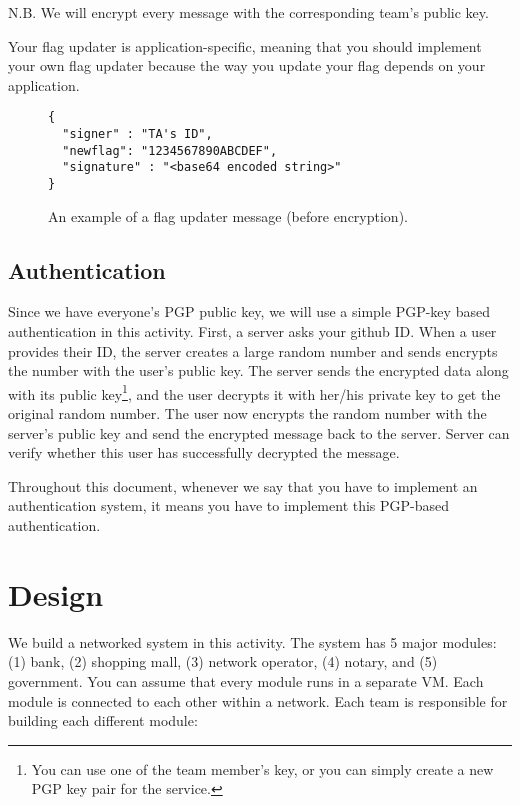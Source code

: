 \documentclass[a4paper, 11pt]{article}
\newcommand*{\modone}{bank\xspace}%
\newcommand*{\modtwo}{shopping mall\xspace}%
\newcommand*{\modthree}{network operator\xspace}%
\newcommand*{\modfour}{notary\xspace}%
\newcommand*{\modfive}{government\xspace}%
\theoremstyle{definition}
\begin{document}
{N.B. We will encrypt every message with the corresponding team's
public key\footnotemark[1].

Your flag updater is application-specific, meaning that you should
implement your own flag updater because the way you update your flag
depends on your application.

\begin{figure}[t]
\begin{lstlisting}[basicstyle=\ttfamily]
{
  "signer" : "TA's ID",
  "newflag": "1234567890ABCDEF",
  "signature" : "<base64 encoded string>"
}
\end{lstlisting}
\caption{An example of a flag updater message (before encryption).}
\label{fig:flagupdater}
\end{figure}

\subsection{Authentication} \label{ss:auth}

Since we have everyone's PGP public key, we will use a simple PGP-key
based authentication in this activity. First, a server asks your
github ID. When a user provides their ID, the server creates a large
random number and sends encrypts the number with the user's public
key. The server sends the encrypted data along with its public
key\footnote{
%
  You can use one of the team member's key, or you can simply create a
  new PGP key pair for the service.
%
}, and the user decrypts it with her/his private key to get the
original random number. The user now encrypts the random number with
the server's public key and send the encrypted message back to the
server. Server can verify whether this user has successfully decrypted
the message.

Throughout this document, whenever we say that you have to implement
an authentication system, it means you have to implement this
PGP-based authentication.

\section{Design}

We build a networked system in this activity. The system has 5 major
modules: (1) \modone, (2) \modtwo, (3) \modthree, (4) \modfour, and
(5) \modfive. You can assume that every module runs in a separate VM.
Each module is connected to each other within a network. Each team is
responsible for building each different module:

}
\end{document}
